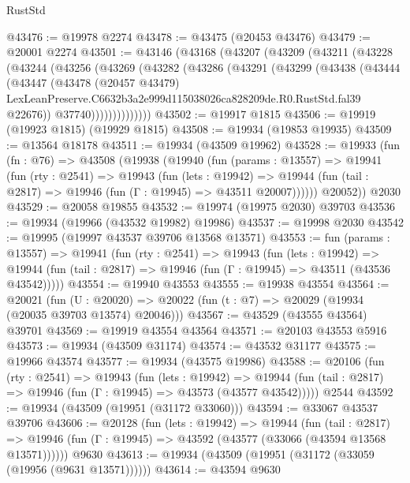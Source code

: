 \begin{lexlean}{RustStd}
\begin{coremodule}
@43476 := @19978 @2274
@43478 := @43475 (@20453 @43476)
@43479 := @20001 @2274
@43501 := @43146
    (@43168
      (@43207
        (@43209
          (@43211
            (@43228
              (@43244
                (@43256
                  (@43269
                    (@43282
                      (@43286
                        (@43291
                          (@43299
                            (@43438
                              (@43444
                                (@43447
                                  (@43478
                                    (@20457 @43479)
                                    LexLeanPreserve.C6632b3a2e999d115038026ca828209de.R0.RustStd.fal39
                                    @22676))
                                @37740))))))))))))))
@43502 := @19917 @1815
@43506 := @19919 (@19923 @1815) (@19929 @1815)
@43508 := @19934 (@19853 @19935)
@43509 := @13564 @18178
@43511 := @19934 (@43509 @19962)
@43528 := @19933
    (fun (fn : @76) =>
    @43508
      (@19938
        (@19940
          (fun (params : @13557) =>
          @19941
            (fun (rty : @2541) =>
            @19943
              (fun (lets : @19942) =>
              @19944 (fun (tail : @2817) => @19946 (fun (Γ : @19945) => @43511 @20007))))))
        @20052))
    @2030
@43529 := @20058 @19855
@43532 := @19974 (@19975 @2030) @39703
@43536 := @19934 (@19966 (@43532 @19982) @19986)
@43537 := @19998 @2030
@43542 := @19995 (@19997 @43537 @39706 @13568 @13571)
@43553 := fun (params : @13557) =>
  @19941
    (fun (rty : @2541) =>
    @19943
      (fun (lets : @19942) =>
      @19944 (fun (tail : @2817) => @19946 (fun (Γ : @19945) => @43511 (@43536 @43542)))))
@43554 := @19940 @43553
@43555 := @19938 @43554
@43564 := @20021
    (fun (U : @20020) => @20022 (fun (t : @7) => @20029 (@19934 (@20035 @39703 @13574) @20046)))
@43567 := @43529 (@43555 @43564) @39701
@43569 := @19919 @43554 @43564
@43571 := @20103 @43553 @5916
@43573 := @19934 (@43509 @31174)
@43574 := @43532 @31177
@43575 := @19966 @43574
@43577 := @19934 (@43575 @19986)
@43588 := @20106
    (fun (rty : @2541) =>
    @19943
      (fun (lets : @19942) =>
      @19944 (fun (tail : @2817) => @19946 (fun (Γ : @19945) => @43573 (@43577 @43542)))))
    @2544
@43592 := @19934 (@43509 (@19951 (@31172 @33060)))
@43594 := @33067 @43537 @39706
@43606 := @20128
    (fun (lets : @19942) =>
    @19944
      (fun (tail : @2817) =>
      @19946 (fun (Γ : @19945) => @43592 (@43577 (@33066 (@43594 @13568 @13571))))))
    @9630
@43613 := @19934 (@43509 (@19951 (@31172 (@33059 (@19956 (@9631 @13571))))))
@43614 := @43594 @9630

\end{coremodule}
\end{lexlean}
